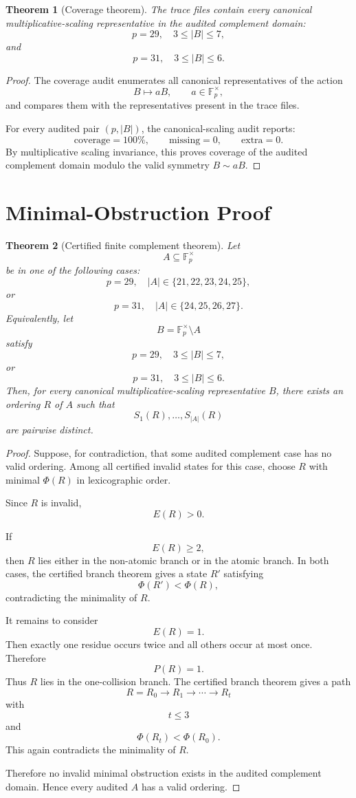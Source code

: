 \documentclass[11pt]{article}
\newtheorem{theorem}{Theorem}
\newcommand{\Fpx}{\mathbb{F}_p^\times}
\newcommand{\PhiPot}{\Phi}
\begin{document}
\begin{theorem}[Coverage theorem]
The trace files contain every canonical multiplicative-scaling representative in the audited complement domain:
\[
p=29,\quad 3\le |B|\le7,
\]
and
\[
p=31,\quad 3\le |B|\le6.
\]
\end{theorem}

\begin{proof}
The coverage audit enumerates all canonical representatives of the action
\[
B\mapsto aB,\qquad a\in\Fpx,
\]
and compares them with the representatives present in the trace files.

For every audited pair \((p,|B|)\), the canonical-scaling audit reports:
\[
\text{coverage}=100\%,\qquad \text{missing}=0,\qquad \text{extra}=0.
\]
By multiplicative scaling invariance, this proves coverage of the audited complement domain modulo the valid symmetry \(B\sim aB\).
\end{proof}

\section{Minimal-Obstruction Proof}

\begin{theorem}[Certified finite complement theorem]
Let
\[
A\subseteq \Fpx
\]
be in one of the following cases:
\[
p=29,\quad |A|\in\{21,22,23,24,25\},
\]
or
\[
p=31,\quad |A|\in\{24,25,26,27\}.
\]
Equivalently, let
\[
B=\Fpx\setminus A
\]
satisfy
\[
p=29,\quad 3\le |B|\le7,
\]
or
\[
p=31,\quad 3\le |B|\le6.
\]
Then, for every canonical multiplicative-scaling representative \(B\), there exists an ordering \(R\) of \(A\) such that
\[
S_1(R),\ldots,S_{|A|}(R)
\]
are pairwise distinct.
\end{theorem}

\begin{proof}
Suppose, for contradiction, that some audited complement case has no valid ordering. Among all certified invalid states for this case, choose \(R\) with minimal \(\PhiPot(R)\) in lexicographic order.

Since \(R\) is invalid,
\[
E(R)>0.
\]

If
\[
E(R)\ge2,
\]
then \(R\) lies either in the non-atomic branch or in the atomic branch. In both cases, the certified branch theorem gives a state \(R'\) satisfying
\[
\PhiPot(R')<\PhiPot(R),
\]
contradicting the minimality of \(R\).

It remains to consider
\[
E(R)=1.
\]
Then exactly one residue occurs twice and all others occur at most once. Therefore
\[
P(R)=1.
\]
Thus \(R\) lies in the one-collision branch. The certified branch theorem gives a path
\[
R=R_0\to R_1\to\cdots\to R_t
\]
with
\[
t\le3
\]
and
\[
\PhiPot(R_t)<\PhiPot(R_0).
\]
This again contradicts the minimality of \(R\).

Therefore no invalid minimal obstruction exists in the audited complement domain. Hence every audited \(A\) has a valid ordering.
\end{proof}
\end{document}
